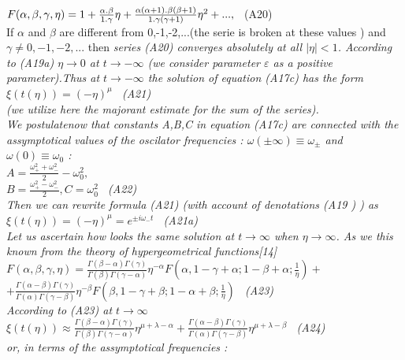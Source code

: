 \documentclass[a4paper,12pt] {article}
\begin{document}
 \\$ F(\alpha, \beta,\gamma,\eta)= 1+\frac {\alpha \bf.\rm  \beta }{1\bf.\rm \gamma} \eta +\frac {\alpha(\alpha+1)\bf.\rm \beta (\beta+1)}{1\bf. \rm \gamma (\gamma+1)} \eta^2 +{\bf...}\rm , $
\ (A20)
\\ If $\alpha$ and $\beta $ are different from 0,-1,-2,...(the serie is broken at these values ) and
$\gamma \neq 0,  -1,-2,...$ then \it  series \rm  (A20)  \it converges absolutely at all \rm
 $ \vert \eta \vert <1 $. According to (A19a) $\eta \to 0$  at $ t\to -\infty$  (we consider parameter
 $\varepsilon$  as a positive parameter).Thus at  $ t\to -\infty$  the solution of equation  (A17c) has the
form \\ $\xi (t(\eta ))=(- \eta) ^ \mu $ \ (A21)\\ (we utilize here the \it majorant \rm estimate for the sum of
 the series).\\We
\it  postulate\rm  now that constants A,B,C in  equation  (A17c) are \it connected with the assymptotical
 values of the oscilator frequencies \rm : $ \omega (\pm \infty) \equiv \omega _\pm  $ and
 $\omega (0) \equiv \omega_0 $ :\\$ A = \frac {\omega_+^2+\omega_-^2}{2}-\omega_0^2, $\\$ B=\frac {\omega_+^2-\omega_-^2}{2}, C=\omega_0^2 $ \ (A22)
\\ Then we can rewrite formula (A21) (with account of denotations (A19 ) ) as
\\$\xi (t(\eta ))=(- \eta) ^{\mu} =e^{\pm i \omega_-t} $ \ (A21a)
\\ Let us ascertain how looks the same solution at $ t \to \infty $ when $ \eta \to \infty $. As we this
known from the theory of hypergeometrical functions[14]
\\$ F (\alpha,\beta,\gamma,\eta) =
\frac {\Gamma(\beta-\alpha)\Gamma(\gamma)}{\Gamma(\beta)\Gamma (\gamma-\alpha)}\eta^{-\alpha} F(\alpha,1-\gamma+\alpha ;1-\beta+\alpha; \frac {1}{\eta})+ $ \\$ + \frac {\Gamma(\alpha-\beta)\Gamma(\gamma)}{\Gamma(\alpha)\Gamma(\gamma-\beta)}\eta^{-\beta} F(\beta,1-\gamma+\beta; 1-\alpha+\beta; \frac{1}{\eta}) $ \ (A23)
\\ According to (A23) at $ t \to \infty $
\\ $\xi (t(\eta )) \approx \frac  {\Gamma(\beta-\alpha)\Gamma(\gamma)}{\Gamma(\beta)\Gamma (\gamma-\alpha)}\eta^{\mu+\lambda -\alpha} +\frac {\Gamma(\alpha-\beta)\Gamma(\gamma)}{\Gamma(\alpha)\Gamma(\gamma-\beta)}
\eta^{\mu+\lambda -\beta} $ \ (A24)\\ or, in  terms of the assymptotical frequencies :
\end{document}
